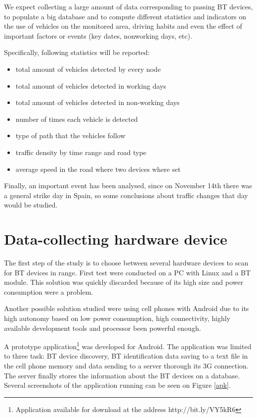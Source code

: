 \documentclass{llncs}
\begin{document}
We expect collecting a large amount of data corresponding to passing BT devices, to populate a big database and to compute different statistics and indicators on the use of vehicles on the monitored area, driving habits and even the effect of important factors or events (key dates, nonworking days, etc).

Specifically, following statistics will be reported:

\begin{itemize}
 \item total amount of vehicles detected by every node
 \item total amount of vehicles detected in working days
 \item total amount of vehicles detected in non-working days
 \item number of times each vehicle is detected
 \item type of path that the vehicles follow
 \item traffic density by time range and road type
 \item average speed in the road where two devices where set
\end{itemize}

Finally, an important event has been analysed, since on November 14th there was a general strike day in Spain, so some conclusions about traffic changes that day would be studied.


\section{Data-collecting hardware device}
\label{hw}

The first step of the study is to choose between several hardware devices to scan for BT devices in range. First test were conducted on a PC with Linux and a BT module. This solution was quickly discarded because of its high size and power consumption were a problem.

Another possible solution studied were using cell phones with Android due to its high autonomy based on low power consumption, high connectivity, highly available development tools and processor been powerful enough.

A prototype application\footnote{Application available for download at the address http://bit.ly/VY5kR6} was developed for Android. The application was limited to three task: BT device discovery, BT identification data saving to a text file in the cell phone memory and data sending to a server thorough its 3G connection. The server finally stores the information about the BT devices on a database. Several screenshots of the application running can be seen on Figure \ref{apk}.
\end{document}
